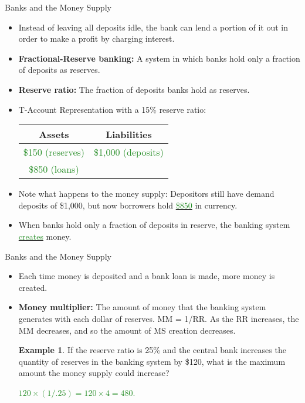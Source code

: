 \documentclass[xcolor={dvipsnames},pdf, hyperref={colorlinks=true, citecolor=ForestGreen, linkcolor=BlueViolet, urlcolor=Magenta}]{beamer}
\theoremstyle{definition}
\newtheorem{exmp}{Example}[section]
\newcommand{\defn}[1]{\textbf{#1}}
\newcommand{\ddp}[1]{{\textcolor{ForestGreen}{#1}}}
\newcommand{\dd}[1]{{\underline{\textcolor{ForestGreen}{#1}}}}
\begin{document}
\begin{frame}{Banks and the Money Supply}
\begin{itemize}
	\item Instead of leaving all deposits idle, the bank can lend a portion of it out in order to make a profit by charging interest. 
	\item \defn{Fractional-Reserve banking:} A system in which banks hold only a fraction of deposits as reserves.
	
	\item \defn{Reserve ratio:} The fraction of deposits banks hold as reserves.
	
	\item T-Account Representation with a 15\% reserve ratio:
	
	\begin{table}[ht]
		\centering
		\begin{tabular}{ c|c }        
			
			Assets & Liabilities \\
			\hline
			\ddp{\$150 (reserves)}&  \ddp{\$1,000 (deposits)}\\
			
			\ddp{\$850 (loans)}	& \\
			
		\end{tabular}
	\end{table}
	
	\item Note what happens to the money supply: Depositors still have demand deposits of \$1,000, but now borrowers hold \dd{\$850} in currency. 
	
	
	\item When banks hold only a fraction of deposits in reserve, the banking system \dd{creates} money.
\end{itemize}
\end{frame}

\begin{frame}{Banks and the Money Supply}
\begin{itemize}
	\item Each time money is deposited and a bank loan is made, more money is created. 
	\item \defn{Money multiplier:} The amount of money that the banking system generates with each dollar of reserves. MM = 1/RR. As the RR increases, the MM decreases, and so the amount of MS creation decreases.
	
	\begin{exmp} 
		If the reserve ratio is 25\% and the central bank increases the quantity of reserves in the banking system by \$120, what is the maximum amount the money supply could increase?
	\end{exmp}

	\ddp{\pause $120 \times (1/.25) = 120 \times 4 = 480$.}
\end{itemize}
\end{frame}
\end{document}
